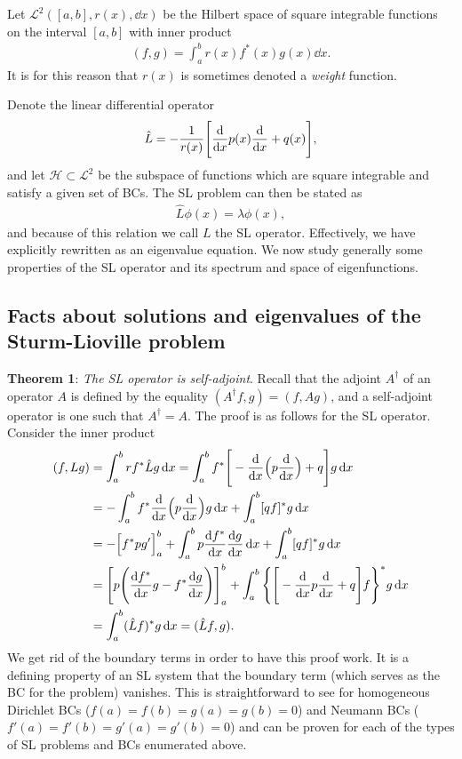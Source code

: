 Let $\mathcal{L}^2([a,b],r(x),\dd{x})$ be the Hilbert space of square integrable functions on the interval $[a,b]$ with inner product
\begin{eqnarray}
    (f,g) = \int_{a}^{b} r(x) f^{*}(x) g(x) \dd{x}
.\end{eqnarray}
It is for this reason that $r(x)$ is sometimes denoted a \textit{weight} function.

Denote the linear differential operator
\begin{eqnarray}
    \label{eq:SL-lin-op}
    \hat{L} = -\frac{1}{r(x)} \Bigg[ \dv{x} p(x) \dv{x} + q(x) \Bigg]
,\end{eqnarray}
and let $\mathcal{H} \subset \mathcal{L}^2$ be the subspace of functions which are square integrable and satisfy a given set of BCs.
The SL problem can then be stated as 
\begin{eqnarray}
    \hat{L} \phi(x) = \lambda \phi(x)
,\end{eqnarray}
and because of this relation we call $L$ the SL operator.
Effectively, we have explicitly rewritten  as an eigenvalue equation.
We now study generally some properties of the SL operator and its spectrum and space of eigenfunctions.

\subsection{Facts about solutions and eigenvalues of the Sturm-Lioville problem}
\textbf{Theorem 1}: \textit{The SL operator is self-adjoint}. Recall that the adjoint $A^{\dagger}$ of an operator $A$ is defined by the equality $(A^{\dagger}f, g) = (f,Ag)$, and a self-adjoint operator is one such that $A^{\dagger} = A$.
The proof is as follows for the SL operator.
Consider the inner product
\begin{align}
    (f,Lg) &= \int_{a}^{b} r f^{*} \hat{L} g \dd{x} = \int_{a}^{b} f^{*} \Bigg[ - \dv{x} \Big( p \dv{x} \Big) + q \Bigg] g \dd{x} \nonumber \\
    &= -\int_{a}^{b} f^{*} \dv{x} \Big( p \dv{x} \Big) g \dd{x} + \int_{a}^{b} [ q f ]^{*} g \dd{x} \nonumber \\
    &= -\Big[ f^{*} p g' \Big]_{a}^{b} + \int_{a}^{b} p \dv{f^{*}}{x} \dv{g}{x} \dd{x} + \int_{a}^{b} [ q f ]^{*} g \dd{x} \nonumber \\
    &= \Bigg[ p \Bigg( \dv{f^{*}}{x} g - f^{*} \dv{g}{x} \Bigg) \Bigg]_{a}^{b} + \int_{a}^{b} \Bigg\{ \Bigg[ -\dv{x} p \dv{x} + q \Bigg] f \Bigg\}^{*} g \dd{x} \nonumber \\
    &= \int_{a}^{b} ( \hat{L} f )^{*} g \dd{x} = ( \hat{L} f,g )
.\end{align}
We get rid of the boundary terms in order to have this proof work.
It is a defining property of an SL system that the boundary term (which serves as the BC for the problem) vanishes.
This is straightforward to see for homogeneous Dirichlet BCs ($f(a) = f(b) = g(a) = g(b) = 0$) and Neumann BCs ($f'(a) = f'(b) = g'(a) = g'(b) = 0$) and can be proven for each of the types of SL problems and BCs enumerated above.


